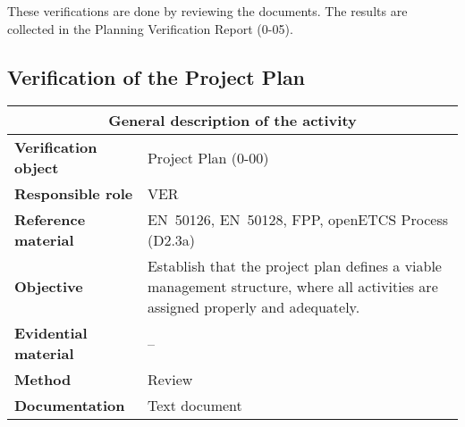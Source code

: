 \documentclass{template/openetcs_report}
\begin{document}
These verifications are done by reviewing the documents. The results
are collected in the Planning Verification Report (0-05).

\subsection{Verification of the Project Plan}
\label{sec:verification-full-00}


\begin{tabular}{|p{3.2cm}|p{11cm}|}
  \hline
  \multicolumn{2}{|c|}{\textbf{General description of the activity}} \\\hline
  \textbf{Verification object} & Project Plan (0-00)
  \\\hline
  \textbf{Responsible role} & VER
  \\\hline
  \textbf{Reference material} & EN~50126, EN~50128, FPP, openETCS
  Process (D2.3a)
  \\\hline
  \textbf{Objective} & Establish that the project plan defines a viable
  management structure, where all activities are assigned properly
  and adequately.
  \\\hline
  \textbf{Evidential material} & --
  \\\hline
  \textbf{Method} & Review
  \\\hline
  \textbf{Documentation} & Text document
  \\\hline
\end{tabular}
\end{document}
